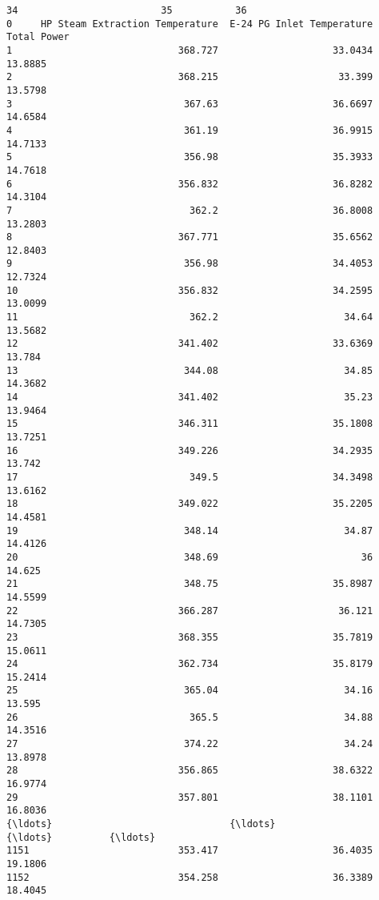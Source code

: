 \documentclass[11pt]{article}
\begin{document}
\begin{tcolorbox}[breakable, size=fbox, boxrule=.5pt, pad at break*=1mm, opacityfill=0]
\begin{Verbatim}[commandchars=\\\{\}]
                                   34                         35           36
0     HP Steam Extraction Temperature  E-24 PG Inlet Temperature  Total Power
1                             368.727                    33.0434      13.8885
2                             368.215                     33.399      13.5798
3                              367.63                    36.6697      14.6584
4                              361.19                    36.9915      14.7133
5                              356.98                    35.3933      14.7618
6                             356.832                    36.8282      14.3104
7                               362.2                    36.8008      13.2803
8                             367.771                    35.6562      12.8403
9                              356.98                    34.4053      12.7324
10                            356.832                    34.2595      13.0099
11                              362.2                      34.64      13.5682
12                            341.402                    33.6369       13.784
13                             344.08                      34.85      14.3682
14                            341.402                      35.23      13.9464
15                            346.311                    35.1808      13.7251
16                            349.226                    34.2935       13.742
17                              349.5                    34.3498      13.6162
18                            349.022                    35.2205      14.4581
19                             348.14                      34.87      14.4126
20                             348.69                         36       14.625
21                             348.75                    35.8987      14.5599
22                            366.287                     36.121      14.7305
23                            368.355                    35.7819      15.0611
24                            362.734                    35.8179      15.2414
25                             365.04                      34.16       13.595
26                              365.5                      34.88      14.3516
27                             374.22                      34.24      13.8978
28                            356.865                    38.6322      16.9774
29                            357.801                    38.1101      16.8036
{\ldots}                               {\ldots}                        {\ldots}          {\ldots}
1151                          353.417                    36.4035      19.1806
1152                          354.258                    36.3389      18.4045

\end{Verbatim}
\end{tcolorbox}
\end{document}
